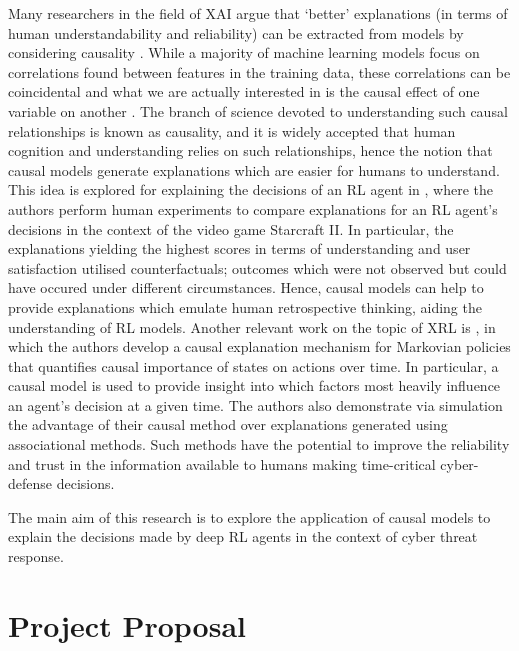 \documentclass{article}
\begin{document}
Many researchers in the field of XAI argue that `better' explanations (in terms of human understandability and reliability) can be extracted from models by considering causality \cite{madumal2020explainable}. While a majority of machine learning models focus on correlations found between features in the training data, these correlations can be coincidental and what we are actually interested in is the causal effect of one variable on another \cite{PearlMackenzie18}. The branch of science devoted to understanding such causal relationships is known as causality, and it is widely accepted that human cognition and understanding relies on such relationships, hence the notion that causal models generate explanations which are easier for humans to understand. This idea is explored for explaining the decisions of an RL agent in \cite{madumal2020distal}, where the authors perform human experiments to compare explanations for an RL agent's decisions in the context of the video game Starcraft II. In particular, the explanations yielding the highest scores in terms of understanding and user satisfaction utilised counterfactuals; outcomes which were not observed but could have occured under different circumstances. Hence, causal models can help to provide explanations which emulate human retrospective thinking, aiding the understanding of RL models. Another relevant work on the topic of XRL is \cite{wang2022causal}, in which the authors develop a causal explanation mechanism for Markovian policies that quantifies causal importance of states on actions over time. In particular, a causal model is used to provide insight into which factors most heavily influence an agent's decision at a given time. The authors also demonstrate via simulation the advantage of their causal method over explanations generated using associational methods. Such methods have the potential to improve the reliability and trust in the information available to humans making time-critical cyber-defense decisions. 

The main aim of this research is to explore the application of causal models to explain the decisions made by deep RL
agents in the context of cyber threat response.



\pagebreak

\section{Project Proposal}

\end{document}

